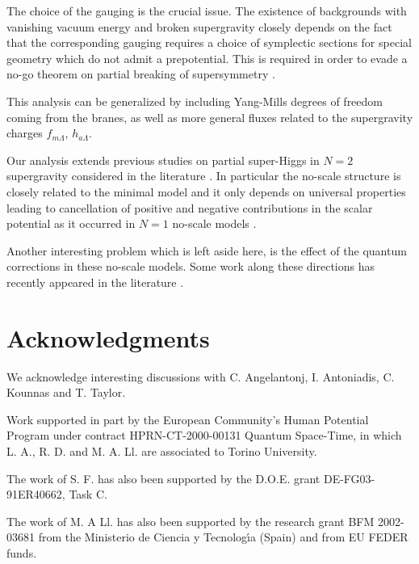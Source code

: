 \documentclass[a4paper,12pt]{article}
\begin{document}
The choice of the gauging is the crucial issue. The existence of
backgrounds with vanishing vacuum energy and broken supergravity
closely depends on the fact that the corresponding gauging
requires a choice of symplectic sections for special geometry
which do not admit a prepotential. This is required in order to
evade a no-go theorem on partial breaking of supersymmetry
\cite{mp}.

This analysis can be generalized by including Yang-Mills degrees
of freedom coming from the branes, as well as more general fluxes
related to the supergravity charges $f_{m\Lambda}$,
$h_{a\Lambda}$.

Our analysis extends previous studies on partial super-Higgs in
$N=2$ supergravity considered in the literature
\cite{ckpdfwg,fkpz,fklz,fgpt}. In particular the no-scale
structure is closely related to the minimal model \cite{cgp,fgp}
and it only depends on universal properties leading to
cancellation of positive and negative contributions in the scalar
potential as it occurred in $N=1$ no-scale models
\cite{cfkn,elnt}.


Another interesting problem which is left aside here, is the
effect of the quantum corrections in these no-scale models. Some
work along these directions has recently appeared in the
literature \cite{bbhl,kklt}.






\section*{Acknowledgments}
We acknowledge interesting discussions with C. Angelantonj, I.
Antoniadis, C. Kounnas and T. Taylor.


 Work supported in part by  the European
Community's Human Potential Program under contract
HPRN-CT-2000-00131 Quantum Space-Time, in which L. A.,  R. D. and
M. A. Ll. are associated to Torino University.

The work of S. F. has also  been supported by the D.O.E. grant
DE-FG03-91ER40662, Task C.

The work of M. A Ll. has also been supported by the research grant
BFM 2002-03681 from the Ministerio de Ciencia y Tecnolog\'{\i}a
(Spain) and from EU FEDER funds.
\end{document}
